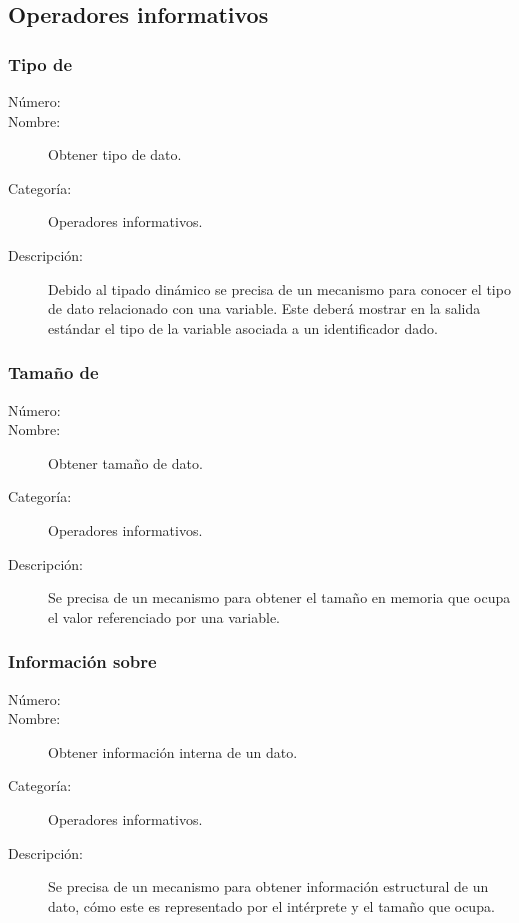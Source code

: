 \subsection{Operadores informativos}
\subsubsection{Tipo de}
	\begin{description}
		\item [Número:] \cn
		\item [Nombre:] Obtener tipo de dato.
		\item [Categoría:] Operadores informativos.
		\item [Descripción:] Debido al tipado dinámico se precisa de un mecanismo para conocer el tipo de dato relacionado
		con una variable. Este deberá mostrar en la salida estándar el tipo de la variable asociada a un identificador dado.
	\end {description}

\subsubsection{Tamaño de}
	\begin{description}
		\item [Número:] \cn
		\item [Nombre:] Obtener tamaño de dato.
		\item [Categoría:] Operadores informativos.
		\item [Descripción:] Se precisa de un mecanismo para obtener el tamaño en memoria que ocupa el valor referenciado por una variable.
	\end {description}

\subsubsection{Información sobre}
	\begin{description}
		\item [Número:] \cn
		\item [Nombre:] Obtener información interna de un dato.
		\item [Categoría:] Operadores informativos.
		\item [Descripción:] Se precisa de un mecanismo para obtener información estructural de un dato, cómo este es representado por 
      el intérprete y el tamaño que ocupa.
	\end {description}
